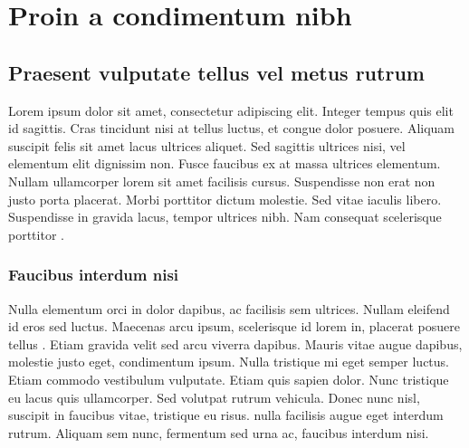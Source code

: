 % 
% 
% 




\chapter{Proin a condimentum nibh}


\section{Praesent vulputate tellus vel metus rutrum}


Lorem ipsum dolor sit amet, consectetur adipiscing elit. Integer tempus quis elit id sagittis. Cras tincidunt nisi at tellus luctus, et congue dolor posuere. Aliquam suscipit felis sit amet lacus ultrices aliquet. Sed sagittis ultrices nisi, vel elementum elit dignissim non. Fusce faucibus ex at massa ultrices elementum. Nullam ullamcorper lorem sit amet facilisis cursus. Suspendisse non erat non justo porta placerat. Morbi porttitor dictum molestie. Sed vitae iaculis libero. Suspendisse in gravida lacus, tempor ultrices nibh. Nam consequat scelerisque porttitor \cite{europa_rohs, europa_ce}.


\subsection{Faucibus interdum nisi}

Nulla elementum orci in dolor dapibus, ac facilisis sem ultrices. Nullam eleifend id eros sed luctus. Maecenas arcu ipsum, scelerisque id lorem in, placerat posuere tellus \cite{proceedings_piezo}. Etiam gravida velit sed arcu viverra dapibus. Mauris vitae augue dapibus, molestie justo eget, condimentum ipsum. Nulla tristique mi eget semper luctus. Etiam commodo vestibulum vulputate. Etiam quis sapien dolor. Nunc tristique eu lacus quis ullamcorper. Sed volutpat rutrum vehicula. Donec nunc nisl, suscipit in faucibus vitae, tristique eu risus.  nulla facilisis augue eget interdum rutrum. Aliquam sem nunc, fermentum sed urna ac, faucibus interdum nisi.


